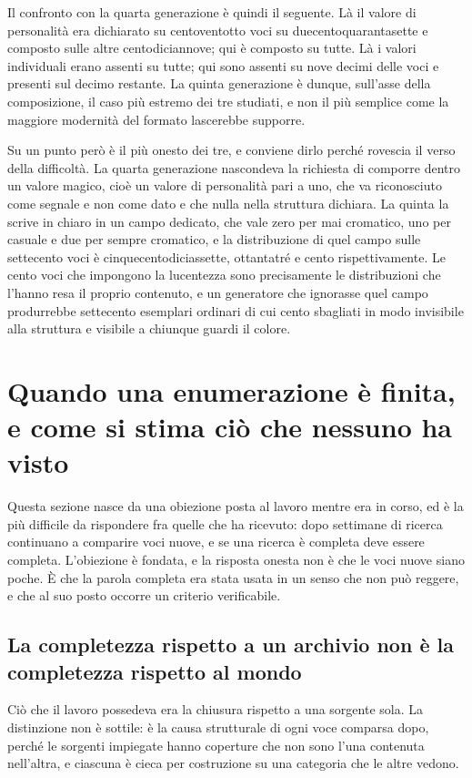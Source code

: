 Il confronto con la quarta generazione è quindi il seguente. Là il valore di personalità era dichiarato su centoventotto voci su duecentoquarantasette e composto sulle altre centodiciannove; qui è composto su tutte. Là i valori individuali erano assenti su tutte; qui sono assenti su nove decimi delle voci e presenti sul decimo restante. La quinta generazione è dunque, sull'asse della composizione, il caso più estremo dei tre studiati, e non il più semplice come la maggiore modernità del formato lascerebbe supporre.

Su un punto però è il più onesto dei tre, e conviene dirlo perché rovescia il verso della difficoltà. La quarta generazione nascondeva la richiesta di comporre dentro un valore magico, cioè un valore di personalità pari a uno, che va riconosciuto come segnale e non come dato e che nulla nella struttura dichiara. La quinta la scrive in chiaro in un campo dedicato, che vale zero per mai cromatico, uno per casuale e due per sempre cromatico, e la distribuzione di quel campo sulle settecento voci è cinquecentodiciassette, ottantatré e cento rispettivamente. Le cento voci che impongono la lucentezza sono precisamente le distribuzioni che l'hanno resa il proprio contenuto, e un generatore che ignorasse quel campo produrrebbe settecento esemplari ordinari di cui cento sbagliati in modo invisibile alla struttura e visibile a chiunque guardi il colore.

\section{Quando una enumerazione è finita, e come si stima ciò che nessuno ha visto}
\label{sec:chiusura-enumerazione}

Questa sezione nasce da una obiezione posta al lavoro mentre era in corso, ed è la più difficile da rispondere fra quelle che ha ricevuto: dopo settimane di ricerca continuano a comparire voci nuove, e se una ricerca è completa deve essere completa. L'obiezione è fondata, e la risposta onesta non è che le voci nuove siano poche. È che la parola completa era stata usata in un senso che non può reggere, e che al suo posto occorre un criterio verificabile.

\subsection{La completezza rispetto a un archivio non è la completezza rispetto al mondo}

Ciò che il lavoro possedeva era la chiusura rispetto a una sorgente sola. La distinzione non è sottile: è la causa strutturale di ogni voce comparsa dopo, perché le sorgenti impiegate hanno coperture che non sono l'una contenuta nell'altra, e ciascuna è cieca per costruzione su una categoria che le altre vedono.

